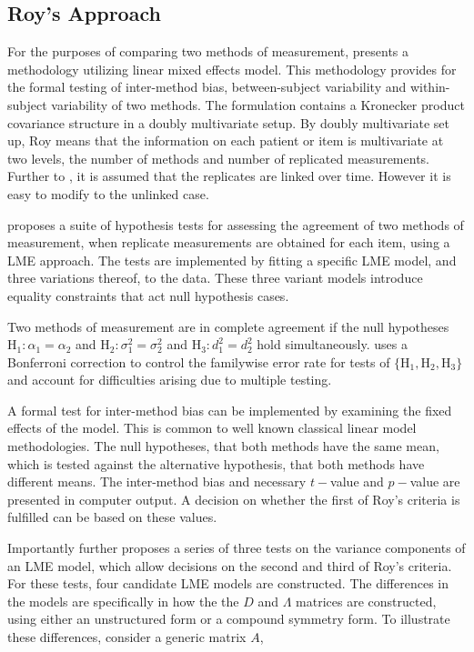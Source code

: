 \documentclass[12pt, a4paper]{report}
\theoremstyle{plain}
\theoremstyle{definition}
\theoremstyle{remark}
\begin{document}

\subsection{Roy's Approach}
		
For the purposes of comparing two methods of measurement, \citet{ARoy2009} presents a methodology utilizing linear mixed effects model. This methodology provides for the formal testing of inter-method bias, between-subject variability and within-subject variability of two methods. The formulation contains a Kronecker product covariance structure in a doubly multivariate setup. By doubly multivariate set up, Roy means that the information on each patient or item is multivariate at two levels, the number of methods and number of replicated measurements. Further to \citet{lam}, it is assumed that the replicates are linked over time. However it is easy to modify to the unlinked case.
		
\citet{ARoy2009} proposes a suite of hypothesis tests for assessing the agreement of two methods of measurement, when replicate measurements are obtained for each item, using a LME approach. The tests are implemented by fitting a specific LME model, and three variations thereof, to the data. These three variant models introduce equality constraints that act null hypothesis cases.
			
Two methods of measurement are in complete agreement if the null hypotheses $\mathrm{H}_1\colon \alpha_1 = \alpha_2$ and $\mathrm{H}_2\colon \sigma^2_1 = \sigma^2_2 $ and $\mathrm{H}_3\colon d^2_1= d^2_2$ hold simultaneously. \citet{ARoy2009} uses a Bonferroni correction to control the familywise error rate for tests of $\{\mathrm{H}_1, \mathrm{H}_2, \mathrm{H}_3\}$ and account for difficulties arising due to multiple testing. 
				
A formal test for inter-method bias can be implemented by examining the fixed effects of the model. This is common to well known classical linear model methodologies. The null hypotheses, that both methods have the same mean, which is tested against the alternative hypothesis, that both methods have different means.
		The inter-method bias and necessary $t-$value and $p-$value are presented in computer output. A decision on whether the first of Roy's criteria is fulfilled can be based on these values.
		
		Importantly \citet{ARoy2009} further proposes a series of three tests on the variance components of an LME model, which allow decisions on the second and third of Roy's criteria. For these tests, four candidate LME models are constructed. The differences in the models are specifically in how the the $D$ and $\Lambda$ matrices are constructed, using either an unstructured form or a compound symmetry form. To illustrate these differences, consider a generic matrix $A$,
		
\end{document}
